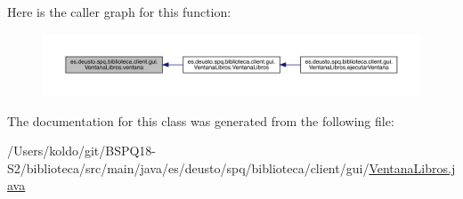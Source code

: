 Here is the caller graph for this function\+:
\nopagebreak
\begin{figure}[H]
\begin{center}
\leavevmode
\includegraphics[width=350pt]{classes_1_1deusto_1_1spq_1_1biblioteca_1_1client_1_1gui_1_1_ventana_libros_a6615018a56e392b80c49c4c49a94f55b_icgraph}
\end{center}
\end{figure}


The documentation for this class was generated from the following file\+:\begin{DoxyCompactItemize}
\item 
/\+Users/koldo/git/\+B\+S\+P\+Q18-\/\+S2/biblioteca/src/main/java/es/deusto/spq/biblioteca/client/gui/\mbox{\hyperlink{_ventana_libros_8java}{Ventana\+Libros.\+java}}\end{DoxyCompactItemize}
